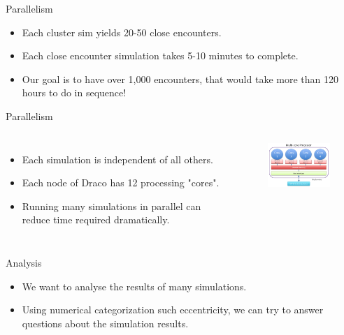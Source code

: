 \documentclass{beamer}
\begin{document}
\begin{frame}{Parallelism}
    \begin{itemize}
        \item Each cluster sim yields 20-50 close encounters.
        \item Each close encounter simulation takes 5-10 minutes to
            complete.
        \item Our goal is to have over 1,000 encounters, that would take
            more than 120 hours to do in sequence!
    \end{itemize}
\end{frame}

\begin{frame}{Parallelism}
    \begin{columns}
        \begin{itemize}
            \item Each simulation is independent of all others.
            \item Each node of Draco has 12 processing "cores".
            \item Running many simulations in parallel can reduce
                time required dramatically.
        \end{itemize}
        \begin{figure}
            \centering
            \includegraphics[width=1.5in]{multicore}
        \end{figure}
    \end{columns}
\end{frame}


\begin{frame}{Analysis}
    \begin{itemize}
        \item We want to analyse the results of many
            simulations.
        \item Using numerical categorization such eccentricity,
            we can try to answer questions about the simulation results.
    \end{itemize}
\end{frame}
\end{document}
